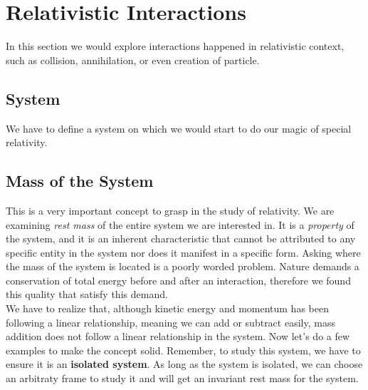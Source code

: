 \documentclass[12pt]{book}
\begin{document}
\section{Relativistic Interactions}
In this section we would explore interactions happened in relativistic context, such as collision, annihilation, or even creation of particle. 

\subsection{System}
We have to define a system on which we would start to do our magic of special relativity.

\subsection{Mass of the System} 
This is a very important concept to grasp in the study of relativity. We are examining \textit{rest mass} of the entire system we are interested in. It is a \textit{property} of the system, and it is an inherent characteristic that cannot be attributed to any specific entity in the system nor does it manifest in a specific form. Asking where the mass of the system is located is a poorly worded problem. Nature demands a conservation of total energy before and after an interaction, therefore we found this quality that satisfy this demand.\\
\newline
We have to realize that, although kinetic energy and momentum has been following a linear relationship, meaning we can add or subtract easily, mass addition does not follow a linear relationship in the system. Now let's do a few examples to make the concept solid. Remember, to study this system, we have to ensure it is an \textbf{isolated system}. As long as the system is isolated, we can choose an arbitraty frame to study it and will get an invariant rest mass for the system.  \\
\end{document}
